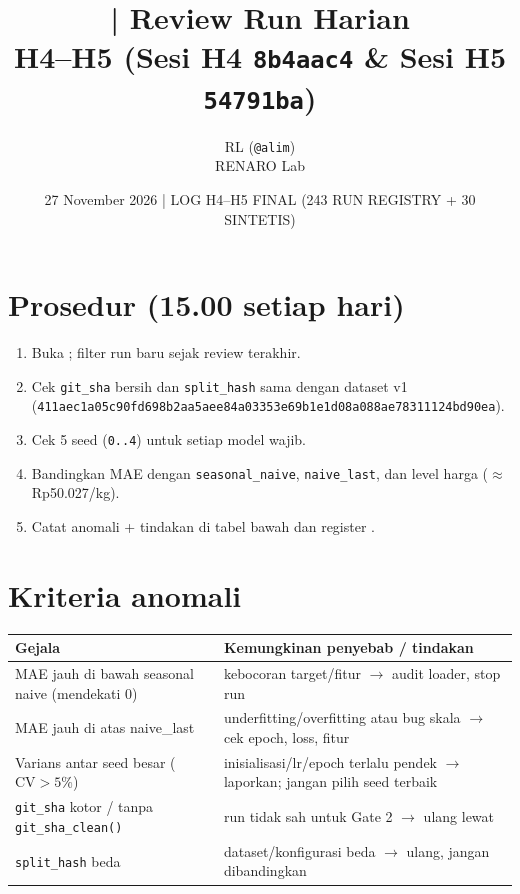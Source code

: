 \documentclass[11pt,a4paper]{article}
\title{\jobid{RL-H4-02} | Review Run Harian\\
\large H4--H5 (Sesi H4 \texttt{8b4aac4} \& Sesi H5 \texttt{54791ba})}
\author{RL (\texttt{@alim}) \\ \small RENARO Lab}
\date{27 November 2026 \quad | \quad \textcolor{blue!70!black}{LOG H4--H5 FINAL (243 RUN REGISTRY + 30 SINTETIS)}}
\begin{document}
\maketitle

\section{Prosedur (15.00 setiap hari)}
\begin{enumerate}
  \item Buka ; filter run baru sejak review terakhir.
  \item Cek \texttt{git\_sha} bersih dan \texttt{split\_hash} sama dengan dataset v1
        (\texttt{411aec1a05c90fd698b2aa5aee84a03353e69b1e1d08a088ae78311124bd90ea}).
  \item Cek 5 seed (\texttt{0..4}) untuk setiap model wajib.
  \item Bandingkan MAE dengan \texttt{seasonal\_naive}, \texttt{naive\_last}, dan level harga
        ($\approx$ Rp50.027/kg).
  \item Catat anomali + tindakan di tabel bawah dan register .
\end{enumerate}

\section{Kriteria anomali}
\begin{table}[H]
\centering
\small
\begin{tabular}{@{}L{6.4cm}L{8.2cm}@{}}
\toprule
Gejala & Kemungkinan penyebab / tindakan \\
\midrule
MAE jauh di bawah seasonal naive (mendekati 0) & kebocoran target/fitur $\to$ audit loader, stop run \\
MAE jauh di atas naive\_last & underfitting/overfitting atau bug skala $\to$ cek epoch, loss, fitur \\
Varians antar seed besar ($\text{CV} > 5\%$) & inisialisasi/lr/epoch terlalu pendek $\to$ laporkan; jangan pilih seed terbaik \\
\texttt{git\_sha} kotor / tanpa \texttt{git\_sha\_clean()} & run tidak sah untuk Gate 2 $\to$ ulang lewat  \\
\texttt{split\_hash} beda & dataset/konfigurasi beda $\to$ ulang, jangan dibandingkan \\
\bottomrule
\end{tabular}
\end{table}
\end{document}
